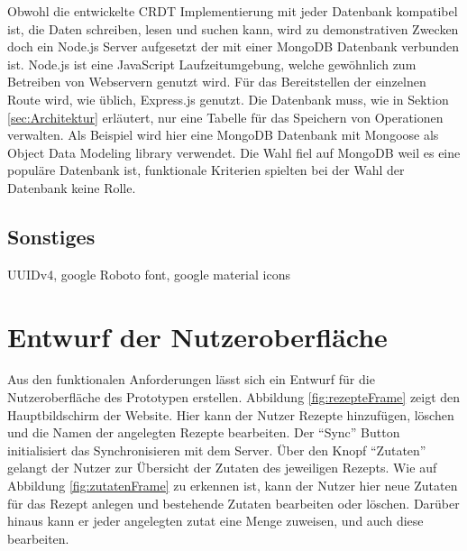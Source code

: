 \documentclass[a4paper, 12pt]{scrreprt}
\begin{document}
Obwohl die entwickelte CRDT Implementierung mit jeder Datenbank kompatibel ist, die Daten schreiben, lesen und suchen kann, wird zu demonstrativen Zwecken doch ein Node.js Server aufgesetzt der mit einer MongoDB Datenbank verbunden ist. Node.js ist eine JavaScript Laufzeitumgebung, welche gewöhnlich zum Betreiben von Webservern genutzt wird. Für das Bereitstellen der einzelnen Route wird, wie üblich, Express.js genutzt. Die Datenbank muss, wie in Sektion \ref{sec:Architektur} erläutert, nur eine Tabelle für das Speichern von Operationen verwalten. Als Beispiel wird hier eine MongoDB Datenbank mit Mongoose als Object Data Modeling library verwendet. Die Wahl fiel auf MongoDB weil es eine populäre Datenbank ist, funktionale Kriterien spielten bei der Wahl der Datenbank keine Rolle. 

\subsection{Sonstiges}
UUIDv4, google Roboto font, google material icons

\section{Entwurf der Nutzeroberfläche}

Aus den funktionalen Anforderungen lässt sich ein Entwurf für die Nutzeroberfläche des Prototypen erstellen. Abbildung \ref{fig:rezepteFrame} zeigt den Hauptbildschirm der Website. Hier kann der Nutzer Rezepte hinzufügen, löschen und die Namen der angelegten Rezepte bearbeiten. Der \enquote{Sync} Button initialisiert das Synchronisieren mit dem Server. Über den Knopf \enquote{Zutaten} gelangt der Nutzer zur Übersicht der Zutaten des jeweiligen Rezepts. Wie auf Abbildung \ref{fig:zutatenFrame} zu erkennen ist, kann der Nutzer hier neue Zutaten für das Rezept anlegen und bestehende Zutaten bearbeiten oder löschen. Darüber hinaus kann er jeder angelegten zutat eine Menge zuweisen, und auch diese bearbeiten. 
\end{document}
